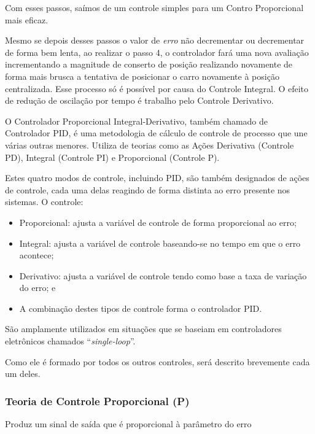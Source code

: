 \documentclass[portugues, brazil, a4paper,12pt]{article}
\begin{document}
			Com esses passos, saímos de um controle simples para um Contro Proporcional mais eficaz. 
			
			Mesmo se depois desses passos o valor de \textit{erro} não decrementar ou decrementar de forma bem lenta, ao realizar o passo 4, o controlador fará uma nova avaliação incrementando a magnitude de conserto de posição realizando novamente de forma mais brusca a tentativa de posicionar o carro novamente à posição centralizada. Esse processo só é possível por causa do Controle Integral. O efeito de redução de oscilação por tempo é trabalho pelo Controle Derivativo.
	
		O Controlador Proporcional Integral-Derivativo, também chamado de Controlador PID, é uma metodologia de cálculo de controle de processo que une várias outras menores. Utiliza de teorias como as Ações Derivativa (Controle PD), Integral (Controle PI) e Proporcional (Controle P).
		
		Estes quatro modos de controle, incluindo PID, são também designados de ações de controle, cada uma delas reagindo de forma distinta ao erro presente nos sistemas. O controle:
		
		\begin{itemize}
			\item Proporcional: ajusta a variável de controle de forma proporcional ao erro;
			\item Integral: ajusta a variável de controle baseando-se no tempo em que o erro acontece;
			\item Derivativo: ajusta a variável de controle tendo como base a taxa de variação do erro; e
			\item A combinação destes tipos de controle forma o controlador PID.
		\end{itemize}
		
		São amplamente utilizados em situações que se baseiam em controladores eletrônicos chamados ``\textit{single-loop}''.
		
		Como ele é formado por todos os outros controles, será descrito brevemente cada um deles.
		
	\subsubsection{Teoria de Controle Proporcional (P)} \label{sec:P}
	Produz um sinal de saída que é proporcional à parâmetro do erro 
	
\end{document}
